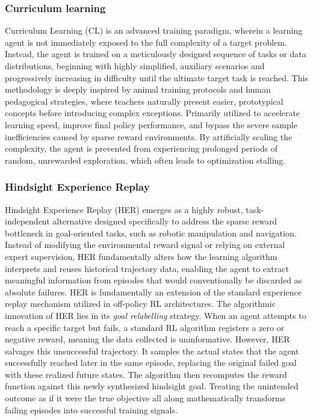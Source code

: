 \subsubsection{Curriculum learning}
\label{an::CL}
Curriculum Learning (CL) is an advanced training paradigm, wherein a learning agent is not immediately exposed to the full complexity of a target problem. Instead, the agent is trained on a meticulously designed sequence of tasks or data distributions, beginning with highly simplified, auxiliary scenarios and progressively increasing in difficulty until the ultimate target task is reached. This methodology is deeply inspired by animal training protocols and human pedagogical strategies, where teachers naturally present easier, prototypical concepts before introducing complex exceptions. Primarily utilized to accelerate learning speed, improve final policy performance, and bypass the severe sample inefficiencies caused by sparse reward environments. By artificially scaling the complexity, the agent is prevented from experiencing prolonged periods of random, unrewarded exploration, which often leads to optimization stalling. \cite{klink2024benefit}
\subsubsection{Hindsight Experience Replay}
Hindsight Experience Replay (HER) emerges as a highly robust, task-independent alternative designed specifically to address the sparse reward bottleneck in goal-oriented tasks, such as robotic manipulation and navigation. Instead of modifying the environmental reward signal or relying on external expert supervision, HER fundamentally alters how the learning algorithm interprets and reuses historical trajectory data, enabling the agent to extract meaningful information from episodes that would conventionally be discarded as absolute failures. HER is fundamentally an extension of the standard experience replay mechanism utilized in off-policy RL architectures. The algorithmic innovation of HER lies in its \textit{goal relabelling} strategy. When an agent attempts to reach a specific target but fails, a standard RL algorithm registers a zero or negative reward, meaning the data collected is uninformative. However, HER salvages this unsuccessful trajectory. It samples the actual states that the agent successfully reached later in the same episode, replacing the original failed goal with these realized future states. The algorithm then recomputes the reward function against this newly synthesized hindsight goal. Treating the unintended outcome as if it were the true objective all along mathematically transforms failing episodes into successful training signals.
\cite{SparseRewardProblem} 


